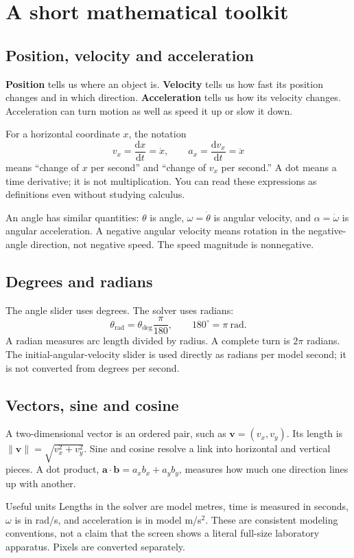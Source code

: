 \documentclass[11pt,a4paper]{article}
\newcommand{\dd}{\mathrm{d}}\newcommand{\vect}[1]{\boldsymbol{#1}}
\begin{document}
\section{A short mathematical toolkit}
\subsection{Position, velocity and acceleration}
\textbf{Position} tells us where an object is. \textbf{Velocity} tells us how fast its position changes and in which direction. \textbf{Acceleration} tells us how its velocity changes. Acceleration can turn motion as well as speed it up or slow it down.

For a horizontal coordinate \(x\), the notation
\[
 v_x=\frac{\dd x}{\dd t}=\dot x,\qquad a_x=\frac{\dd v_x}{\dd t}=\ddot x
\]
means ``change of \(x\) per second'' and ``change of \(v_x\) per second.'' A dot means a time derivative; it is not multiplication. You can read these expressions as definitions even without studying calculus.

An angle has similar quantities: \(\theta\) is angle, \(\omega=\dot\theta\) is angular velocity, and \(\alpha=\dot\omega\) is angular acceleration. A negative angular velocity means rotation in the negative-angle direction, not negative speed. The speed magnitude is nonnegative.
\subsection{Degrees and radians}
The angle slider uses degrees. The solver uses radians:
\[
 \theta_{\mathrm{rad}}=\theta_{\mathrm{deg}}\frac{\pi}{180},\qquad
 180^\circ=\pi\ \mathrm{rad}.
\]
A radian measures arc length divided by radius. A complete turn is \(2\pi\) radians. The initial-angular-velocity slider is used directly as radians per model second; it is not converted from degrees per second.
\subsection{Vectors, sine and cosine}
A two-dimensional vector is an ordered pair, such as \(\vect v=(v_x,v_y)\). Its length is \(\lVert\vect v\rVert=\sqrt{v_x^2+v_y^2}\). Sine and cosine resolve a link into horizontal and vertical pieces. A dot product, \(\vect a\cdot\vect b=a_xb_x+a_yb_y\), measures how much one direction lines up with another.
\begin{idea}{Useful units}
Lengths in the solver are model metres, time is measured in seconds, \(\omega\) is in rad/s, and acceleration is in model m/s\(^2\). These are consistent modeling conventions, not a claim that the screen shows a literal full-size laboratory apparatus. Pixels are converted separately.
\end{idea}
\end{document}
